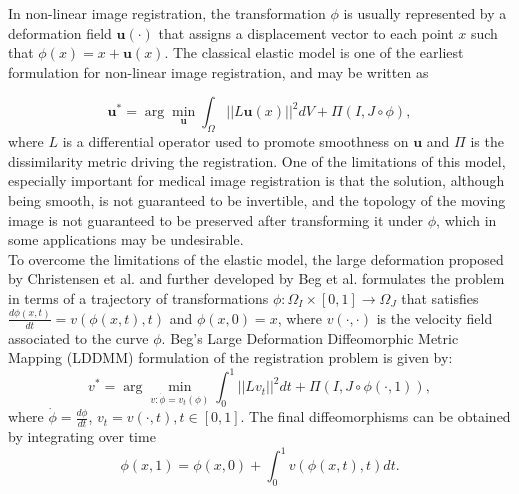In non-linear image registration, the transformation $\phi$ is usually represented by a deformation field $\mathbf{u(\cdot)}$ that assigns a displacement vector
to each point $x$ such that $\phi(x) = x + \mathbf{u}(x)$. The classical elastic model is one of the earliest formulation for non-linear image registration,
and may be written as

\begin{equation}\label{eq:elastic}
    \mathbf{u}^{*} = \arg \min_{\mathbf{u}} \int_{\Omega} ||L \mathbf{u}(x)||^{2}dV + \Pi(I, J \circ \phi),
\end{equation}
where $L$ is a differential operator used to promote smoothness on $\mathbf{u}$ and $\Pi$ is the dissimilarity metric driving the registration. One of the limitations of this model,
especially important for medical image registration is that the solution, although being smooth, is not guaranteed to be invertible, and the topology of the moving image is not guaranteed to
be preserved after transforming it under $\phi$, which in some applications may be undesirable.\\

To overcome the limitations of the elastic model, the large deformation proposed by  Christensen et al. \cite{Christensen2001} and further developed by Beg et al. \cite{Science2005}
formulates the problem in terms of a trajectory of transformations
\hbox{$\phi:\Omega_{I} \times [0, 1] \rightarrow \Omega_{J}$} that satisfies $\frac{d \phi(x, t)}{dt} = v(\phi(x, t), t)$ and $\phi(x, 0) = x$, where $v(\cdot, \cdot)$ is
the velocity field associated to the curve $\phi$. Beg's Large Deformation Diffeomorphic Metric Mapping (LDDMM) \cite{Science2005} formulation of the registration problem is given by:
\begin{equation}\label{eq:LDDMM}
    v^{*} = \arg \min_{v:\dot{\phi} = v_{t}(\phi)} \int_{0}^{1} ||L v_{t}||^{2} dt + \Pi(I, J \circ \phi(\cdot, 1)),
\end{equation}
where $\dot{\phi} = \frac{d\phi}{dt}$, $v_{t} = v(\cdot, t), t\in [0, 1]$. The final diffeomorphisms can be obtained by integrating over time
\begin{equation}\label{eq:velocity_integral}
    \phi(x, 1) = \phi(x, 0) + \int_{0}^{1}v(\phi(x, t), t) dt.
\end{equation}

